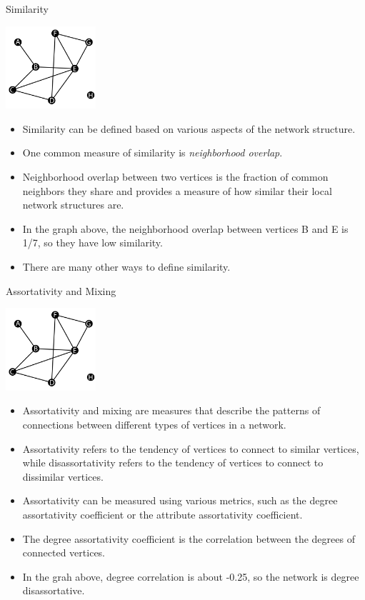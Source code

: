\documentclass[9pt,handout]{beamer}
\let\olditem\item
\renewcommand{\item}{\olditem\vfill}
\begin{document}
\begin{frame}{Similarity}
  \begin{center}
    \includegraphics[width=0.25\textwidth]{week_02_lecture_img_01}
  \end{center}    
  \begin{itemize}
    \item Similarity can be defined based on various aspects of the network structure.
    \item One common measure of similarity is \emph{neighborhood overlap}.
    \item Neighborhood overlap between two vertices is the fraction of common neighbors they share and provides a measure of how similar their local network structures are.
    \item In the graph above, the neighborhood overlap between vertices B and E is 1/7, so they have low similarity.
    \item There are many other ways to define similarity.
  \end{itemize}
\end{frame}


\begin{frame}{Assortativity and Mixing}
  \begin{center}
    \includegraphics[width=0.25\textwidth]{week_02_lecture_img_01}
  \end{center}    
  \begin{itemize}
    \item Assortativity and mixing are measures that describe the patterns of connections between different types of vertices in a network.
    \item Assortativity refers to the tendency of vertices to connect to similar vertices, while disassortativity refers to the tendency of vertices to connect to dissimilar vertices.
    \item Assortativity can be measured using various metrics, such as the degree assortativity coefficient or the attribute assortativity coefficient.
    \item The degree assortativity coefficient is the correlation between the degrees of connected vertices. 
    \item In the grah above, degree correlation is about -0.25, so the network is degree disassortative.
  \end{itemize}
\end{frame}
\end{document}
